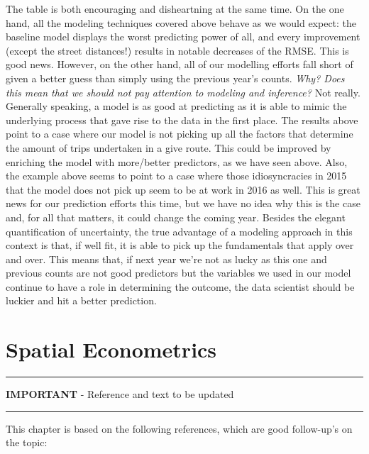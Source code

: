 \documentclass[
]{book}
\begin{document}
The table is both encouraging and disheartning at the same time. On the one hand, all the modeling techniques covered above behave as we would expect: the baseline model displays the worst predicting power of all, and every improvement (except the street distances!) results in notable decreases of the RMSE. This is good news. However, on the other hand, all of our modelling efforts fall short of given a better guess than simply using the previous year's counts. \emph{Why? Does this mean that we should not pay attention to modeling and inference?} Not really. Generally speaking, a model is as good at predicting as it is able to mimic the underlying process that gave rise to the data in the first place. The results above point to a case where our model is not picking up all the factors that determine the amount of trips undertaken in a give route. This could be improved by enriching the model with more/better predictors, as we have seen above. Also, the example above seems to point to a case where those idiosyncracies in 2015 that the model does not pick up seem to be at work in 2016 as well. This is great news for our prediction efforts this time, but we have no idea why this is the case and, for all that matters, it could change the coming year. Besides the elegant quantification of uncertainty, the true advantage of a modeling approach in this context is that, if well fit, it is able to pick up the fundamentals that apply over and over. This means that, if next year we're not as lucky as this one and previous counts are not good predictors but the variables we used in our model continue to have a role in determining the outcome, the data scientist should be luckier and hit a better prediction.

\hypertarget{spatialecon}{%
\chapter{Spatial Econometrics}\label{spatialecon}}

\begin{center}\rule{0.5\linewidth}{0.5pt}\end{center}

\textbf{IMPORTANT} - Reference and text to be updated

\begin{center}\rule{0.5\linewidth}{0.5pt}\end{center}

This chapter is based on the following references, which are good follow-up's on the topic:
\end{document}
